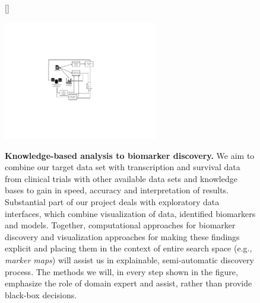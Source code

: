 \documentclass[11pt,a4paper]{article}
\renewcommand{\bold}{\textbf}
\begin{document}
\begin{description}
\begin{figure}
[\FBwidth]
{\caption{\bold{Knowledge-based analysis to biomarker discovery.} We aim to combine our target data set with transcription and survival data from clinical trials with other available data sets and knowledge bases to gain in speed, accuracy and interpretation of results. Substantial part of our project deals with exploratory data interfaces, which combine visualization of data, identified biomarkers and models. Together, computational approaches for biomarker discovery and visualization approaches for making these findings explicit and placing them in the context of entire search space (e.g., {\em marker maps}) will assist us in explainable, semi-automatic discovery process. The methods we will, in every step shown in the figure, emphasize the role of domain expert and assist, rather than provide black-box decisions.}
\label{fig:approach}}
{\includegraphics[width=0.6\textwidth]{approach}}
\end{figure}





\end{description}
\end{document}
